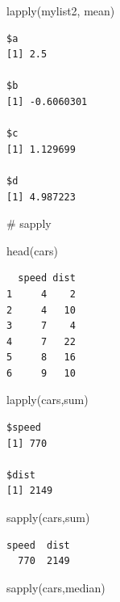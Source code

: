 \documentclass[
  letterpaper,
  DIV=11,
  numbers=noendperiod]{scrreprt}
\newenvironment{Shaded}{\begin{snugshade}}{\end{snugshade}}
\newcommand{\CommentTok}[1]{\textcolor[rgb]{0.37,0.37,0.37}{#1}}
\newcommand{\FunctionTok}[1]{\textcolor[rgb]{0.28,0.35,0.67}{#1}}
\newcommand{\NormalTok}[1]{\textcolor[rgb]{0.00,0.23,0.31}{#1}}
\begin{document}
\begin{Shaded}
\begin{Highlighting}[]
\FunctionTok{lapply}\NormalTok{(mylist2, mean)}
\end{Highlighting}
\end{Shaded}

\begin{verbatim}
$a
[1] 2.5

$b
[1] -0.6060301

$c
[1] 1.129699

$d
[1] 4.987223
\end{verbatim}

\begin{Shaded}
\begin{Highlighting}[]
\CommentTok{\# sapply}

\FunctionTok{head}\NormalTok{(cars)}
\end{Highlighting}
\end{Shaded}

\begin{verbatim}
  speed dist
1     4    2
2     4   10
3     7    4
4     7   22
5     8   16
6     9   10
\end{verbatim}

\begin{Shaded}
\begin{Highlighting}[]
\FunctionTok{lapply}\NormalTok{(cars,sum)}
\end{Highlighting}
\end{Shaded}

\begin{verbatim}
$speed
[1] 770

$dist
[1] 2149
\end{verbatim}

\begin{Shaded}
\begin{Highlighting}[]
\FunctionTok{sapply}\NormalTok{(cars,sum)}
\end{Highlighting}
\end{Shaded}

\begin{verbatim}
speed  dist 
  770  2149 
\end{verbatim}

\begin{Shaded}
\begin{Highlighting}[]
\FunctionTok{sapply}\NormalTok{(cars,median)}
\end{Highlighting}
\end{Shaded}
\end{document}

